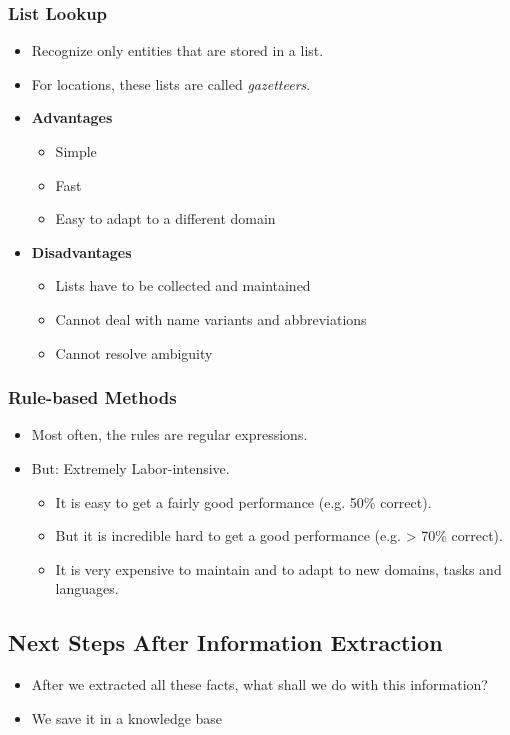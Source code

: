 	\subsubsection{List Lookup} %
		\begin{itemize}
			\item Recognize only entities that are stored in a list.
			\item For locations, these lists are called \textit{gazetteers}.
			\item \textbf{Advantages}
				\begin{itemize}
					\item Simple
					\item Fast
					\item Easy to adapt to a different domain
				\end{itemize}
			\item \textbf{Disadvantages}
				\begin{itemize}
					\item Lists have to be collected and maintained
					\item Cannot deal with name variants and abbreviations
					\item Cannot resolve ambiguity
				\end{itemize}
		\end{itemize}

	\subsubsection{Rule-based Methods} %
		\begin{itemize}
			\item Most often, the rules are regular expressions.
			\item But: Extremely Labor-intensive.
				\begin{itemize}
					\item It is easy to get a fairly good performance (e.g. 50\% correct).
					\item But it is incredible hard to get a good performance (e.g. > 70\% correct).
					\item It is very expensive to maintain and to adapt to new domains, tasks and languages.
				\end{itemize}
		\end{itemize}
\subsection{Next Steps After Information Extraction} %
	\begin{itemize}
		\item After we extracted all these facts, what shall we do with this information?
		\item We save it in a knowledge base
	\end{itemize}

